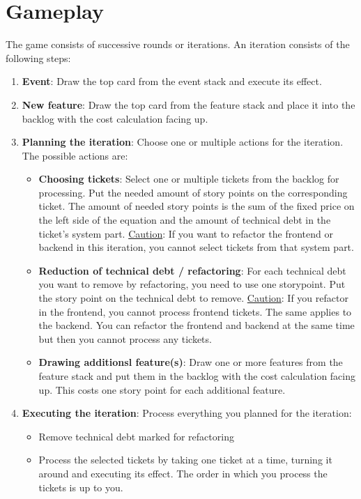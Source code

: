 \documentclass[a4paper, 11pt]{scrartcl}
\begin{document}
\newpage

\section*{Gameplay}

The game consists of successive rounds or iterations. An iteration consists of the following steps:

\begin{enumerate}
    \item \textbf{Event}: Draw the top card from the event stack and execute its effect.
    \item \textbf{New feature}: Draw the top card from the feature stack and place it into the backlog with the cost calculation facing up.
    \item \textbf{Planning the iteration}: Choose one or multiple actions for the iteration. The possible actions are:
    \begin{itemize}
        \item \textbf{Choosing tickets}: Select one or multiple tickets from the backlog for processing. Put the needed amount of story points on the corresponding ticket. The amount of needed story points is the sum of the fixed price on the left side of the equation and the amount of technical debt in the ticket's system part. \underline{Caution}: If you want to refactor the frontend or backend in this iteration, you cannot select tickets from that system part.
        \item \textbf{Reduction of technical debt / refactoring}: For each technical debt you want to remove by refactoring, you need to use one storypoint. Put the story point on the technical debt to remove. \underline{Caution}: If you refactor in the frontend, you cannot process frontend tickets. The same applies to the backend. You can refactor the frontend and backend at the same time but then you cannot process any tickets.
        \item \textbf{Drawing additionsl feature(s)}: Draw one or more features from the feature stack and put them in the backlog with the cost calculation facing up. This costs one story point for each additional feature.
    \end{itemize}
    \item \textbf{Executing the iteration}: Process everything you planned for the iteration:
    \begin{itemize}
        \item Remove technical debt marked for refactoring
        \item Process the selected tickets by taking one ticket at a time, turning it around and executing its effect. The order in which you process the tickets is up to you.

\end{itemize}
\end{enumerate}
\end{document}
